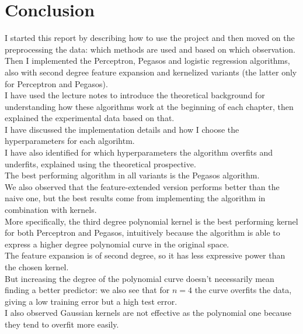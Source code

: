 \newpage

\section{Conclusion}
I started this report by describing how to use the project and then moved on the preprocessing the data: which methods are used and based on which observation.\\
Then I implemented the Perceptron, Pegasos and logistic regression algorithms, also with second degree feature expansion and kernelized variants (the latter only for Perceptron and Pegasos).\\
I have used the lecture notes to introduce the theoretical background for understanding how these algorithms work at the beginning of each chapter, then explained the experimental data based on that.\\
I have discussed the implementation details and how I choose the hyperparameters for each algorihtm.\\
I have also identified for which hyperparameters the algorithm overfits and underfits, explained using the theoretical prospective.\\
The best performing algorithm in all variants is the Pegasos algorithm.\\
We also observed that the feature-extended version performs better than the naive one, but the best results come from implementing the algorithm in combination with kernels.\\
More specifically, the third degree polynomial kernel is the best performing kernel for both Perceptron and Pegasos, intuitively because the algorithm is able to express a higher degree polynomial curve in the original space.\\
The feature expansion is of second degree, so it has less expressive power than the chosen kernel.\\
But increasing the degree of the polynomial curve doesn't necessarily mean finding a better predictor: we also see that for $n = 4$ the curve overfits the data, giving a low training error but a high test error.\\
I also observed Gaussian kernels are not effective as the polynomial one because they tend to overfit more easily.\\
